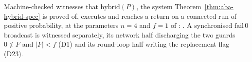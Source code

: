 \begin{definition}
  \label{def:aba-nonvacuity}
  \leanok
  Machine-checked witnesses that $\mathrm{hybrid}(P)$, the system Theorem~\ref{thm:aba-hybrid-spec} is proved of, executes and reaches a return on a connected run of positive probability, at the parameters $n = 4$ and $f = 1$ of : .
  A synchronised $\mathrm{fail}\,0$ broadcast is witnessed separately, its network half discharging the two guards $0 \notin F$ and $|F| < f$ (D1) and its round-loop half writing the replacement flag (D23).
\end{definition}
